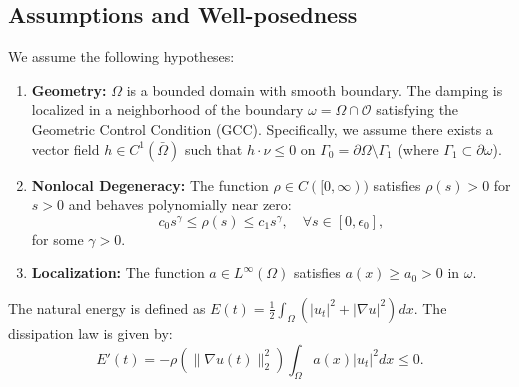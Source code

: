 \documentclass[11pt,reqno]{amsart}
\theoremstyle{remark}
\begin{document}
\subsection{Assumptions and Well-posedness}

We assume the following hypotheses:
\begin{enumerate}
    \item[(H1)] \textbf{Geometry:} $\Omega$ is a bounded domain with smooth boundary. The damping is localized in a neighborhood of the boundary $\omega = \Omega \cap \mathcal{O}$ satisfying the Geometric Control Condition (GCC). Specifically, we assume there exists a vector field $h \in C^1(\bar{\Omega})$ such that $h \cdot \nu \le 0$ on $\Gamma_0 = \partial\Omega \setminus \Gamma_1$ (where $\Gamma_1 \subset \partial\omega$).
    \item[(H2)] \textbf{Nonlocal Degeneracy:} The function $\rho \in C([0, \infty))$ satisfies $\rho(s) > 0$ for $s > 0$ and behaves polynomially near zero:
    \begin{equation}\label{cond:rho_deg}
        c_0 s^\gamma \le \rho(s) \le c_1 s^\gamma, \quad \forall s \in [0, \epsilon_0],
    \end{equation}
    for some $\gamma > 0$.
    \item[(H3)] \textbf{Localization:} The function $a \in L^\infty(\Omega)$ satisfies $a(x) \ge a_0 > 0$ in $\omega$.
\end{enumerate}

The natural energy is defined as $E(t) = \frac{1}{2} \int_\Omega (|u_t|^2 + |\nabla u|^2) dx$. The dissipation law is given by:
\begin{equation}\label{eq:dissip_kirchhoff}
    E'(t) = - \rho(\|\nabla u(t)\|_2^2) \int_\Omega a(x) |u_t|^2 dx \le 0.
\end{equation}
\end{document}

